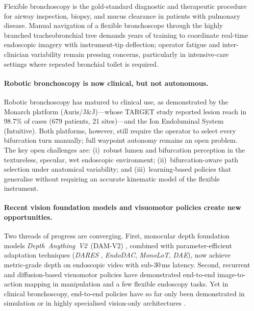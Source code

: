 \documentclass[journal,comsoc]{IEEEtran}
\begin{document}
Flexible bronchoscopy is the gold-standard diagnostic and therapeutic
procedure for airway inspection, biopsy, and mucus clearance in
patients with pulmonary disease. Manual navigation of a flexible
bronchoscope through the highly branched tracheobronchial tree
demands years of training to coordinate real-time endoscopic imagery
with instrument-tip deflection; operator fatigue and inter-clinician
variability remain pressing concerns, particularly in intensive-care
settings where repeated bronchial toilet is required.

\paragraph{Robotic bronchoscopy is now clinical, but not autonomous.}
Robotic bronchoscopy has matured to clinical use, as demonstrated by
the Monarch platform (Auris/J\&J)\cite{target2025}---whose TARGET
study reported lesion reach in 98.7\% of cases (679 patients,
21 sites)---and the Ion Endoluminal System (Intuitive)\cite{target2025}.
Both platforms, however, still require the operator to select every
bifurcation turn manually; full waypoint autonomy remains an open
problem. The key open challenges are: (i)~robust lumen and bifurcation
perception in the textureless, specular, wet endoscopic environment;
(ii)~bifurcation-aware path selection under anatomical variability;
and (iii)~learning-based policies that generalise without requiring an
accurate kinematic model of the flexible instrument.

\paragraph{Recent vision foundation models and visuomotor policies
create new opportunities.}
Two threads of progress are converging. First, monocular depth
foundation models \textit{Depth~Anything~V2}~(DAM-V2)
\cite{yang2024depthv2,oquab2023dinov2}, combined with parameter-efficient
adaptation techniques (\textit{DARES} \cite{dares2024},
\textit{EndoDAC}\cite{endodac2024}, \textit{MonoLoT}\cite{monolot2024},
\textit{DAE}\cite{longshort2026}), now achieve metric-grade depth on
endoscopic video with sub-30\,ms latency. Second, recurrent and
diffusion-based visuomotor policies
\cite{cho2014gru,chi2023diffusion,zhao2023act} have demonstrated
end-to-end image-to-action mapping in manipulation and a few flexible
endoscopy tasks. Yet in clinical bronchoscopy, end-to-end policies
have so far only been demonstrated in simulation
\cite{pore2024bronchocopilot,zhang2024aicopilot} or in highly
specialised vision-only architectures
\cite{longshort2026}.
\end{document}
